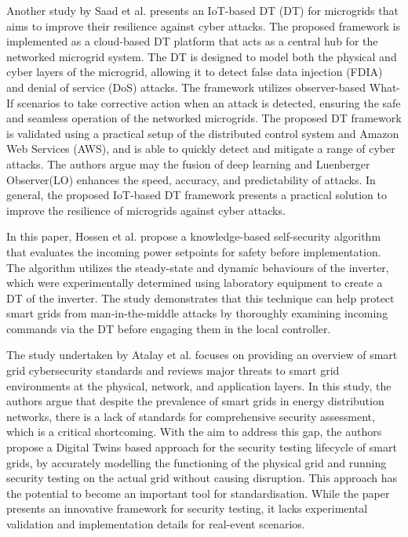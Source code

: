 Another study by Saad et al.\cite{saadImplementationIoTBasedDigital2020} presents an IoT-based DT (DT) for microgrids that aims to improve their resilience against cyber attacks. The proposed framework is implemented as a cloud-based DT platform that acts as a central hub for the networked microgrid system. The DT is designed to model both the physical and cyber layers of the microgrid, allowing it to detect false data injection (FDIA) and denial of service (DoS) attacks. The framework utilizes observer-based What-If scenarios to take corrective action when an attack is detected, ensuring the safe and seamless operation of the networked microgrids. The proposed DT framework is validated using a practical setup of the distributed control system and Amazon Web Services (AWS), and is able to quickly detect and mitigate a range of cyber attacks. The authors argue may the fusion of deep learning and Luenberger Observer(LO) enhances the speed, accuracy, and predictability of attacks. In general, the proposed IoT-based DT framework presents a practical solution to improve the resilience of microgrids against cyber attacks.

In\cite{hossenDigitalTwinSelfSecurity2021} this paper, Hossen et al. propose a knowledge-based self-security algorithm that evaluates the incoming power setpoints for safety before implementation. The algorithm utilizes the steady-state and dynamic behaviours of the inverter, which were experimentally determined using laboratory equipment to create a DT of the inverter. The study demonstrates that this technique can help protect smart grids from man-in-the-middle attacks by thoroughly examining incoming commands via the DT before engaging them in the local controller.

The study undertaken by Atalay et al.\cite{atalayDigitalTwinsApproach2020} focuses on providing an overview of smart grid cybersecurity standards and reviews major threats to smart grid environments at the physical, network, and application layers. In this study, the authors argue that despite the prevalence of smart grids in energy distribution networks, there is a lack of standards for comprehensive security assessment, which is a critical shortcoming. With the aim to address this gap, the authors propose a Digital Twins based approach for the security testing lifecycle of smart grids, by accurately modelling the functioning of the physical grid and running security testing on the actual grid without causing disruption. This approach has the potential to become an important tool for standardisation. While the paper presents an innovative framework for security testing, it lacks experimental validation and implementation details for real-event scenarios.


